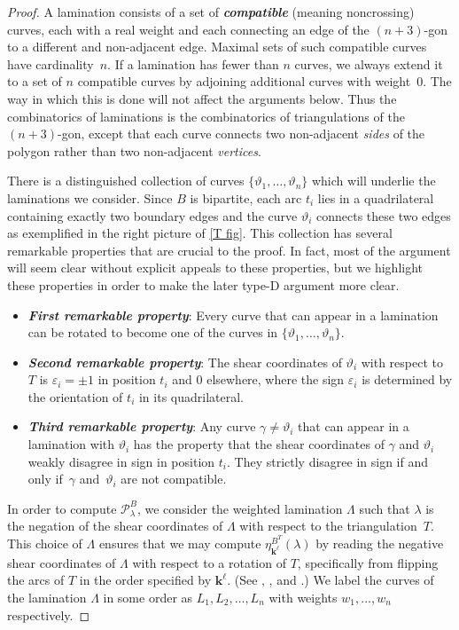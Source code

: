 \documentclass{amsart}
\theoremstyle{definition}
\theoremstyle{remark}
\numberwithin{equation}{section}
\newcommand{\newword}[1]{\textbf{\emph{#1}}}
\newcommand{\thet}{\vartheta}
\newcommand{\set}[1]{{\lbrace #1 \rbrace}}
\newcommand{\0}{{\mathbf{0}}}
\newcommand{\kk}{{\boldsymbol{k}}}
\renewcommand{\P}{\mathcal{P}}
\begin{document}
\begin{proof}
A lamination consists of a set of \newword{compatible} (meaning noncrossing) curves, each with a real weight and each connecting an edge of the $(n+3)$-gon to a different and non-adjacent edge.
Maximal sets of such compatible curves have cardinality~$n$.
If a lamination has fewer than $n$ curves, we always extend it to a set of $n$ compatible curves by adjoining additional curves with weight~$0$.
The way in which this is done will not affect the arguments below.
Thus the combinatorics of laminations is the combinatorics of triangulations of the $(n+3)$-gon, except that each curve connects two non-adjacent \emph{sides} of the polygon rather than two non-adjacent \emph{vertices}.

There is a distinguished collection of curves $\set{\thet_1,\ldots,\thet_n}$ which will underlie the laminations we consider.
Since $B$ is bipartite, each arc $t_i$ lies in a quadrilateral containing exactly two boundary edges and the curve $\thet_i$ connects these two edges as exemplified in the right picture of \cref{T fig}.
This collection has several remarkable properties that are crucial to the proof.  
In fact, most of the argument will seem clear without explicit appeals to these properties, but we highlight these properties in order to make the later type-D argument more clear.

\begin{itemize}
\item
\newword{First remarkable property}:
Every curve that can appear in a lamination can be rotated to become one of the curves in $\set{\thet_1,\ldots,\thet_n}$.
\item
\newword{Second remarkable property}:
The shear coordinates of $\thet_i$ with respect to $T$ is $\varepsilon_i=\pm1$ in position $t_i$ and $0$ elsewhere, where the sign $\varepsilon_i$ is determined by the orientation of $t_i$ in its quadrilateral.
\item
\newword{Third remarkable property}:
Any curve $\gamma\neq\thet_i$ that can appear in a lamination with $\thet_i$ has the property that the shear coordinates of $\gamma$ and $\thet_i$ weakly disagree in sign in position $t_i$.
They strictly disagree in sign if and only if~$\gamma$ and~$\thet_i$ are not compatible.
\end{itemize}

In order to compute $\P^B_\lambda$, we consider the weighted lamination $\Lambda$ such that $\lambda$ is the negation of the shear coordinates of $\Lambda$ with respect to the triangulation~$T$.
This choice of $\Lambda$ ensures that we may compute $\eta^{B^T}_{\kk^\ell}(\lambda)$ by reading the negative shear coordinates of $\Lambda$ with respect to a rotation of $T$, specifically from flipping the arcs of $T$ in the order specified by $\kk^\ell$.
(See \cite[Theorem~12.6]{cats2}, \cite[Theorem~4.3]{unisurface}, and \cite[Section~5]{unisurface}.)
We label the curves of the lamination $\Lambda$ in some order as $L_1,L_2,\ldots,L_n$ with weights $w_1,\ldots,w_n$ respectively.


\end{proof}
\end{document}
